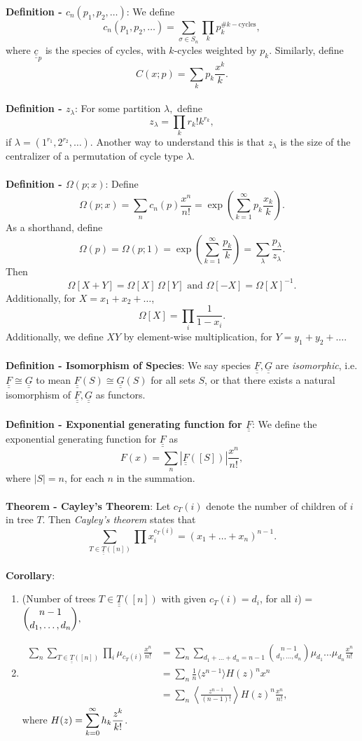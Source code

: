 \documentclass{article}
\newcommand{\species}[1]{\underline{\underline{#1}}}
\begin{document}
\textbf{Definition - $c_n(p_1, p_2, \dots)$}: We define $$c_n(p_1, p_2, \dots) = \sum_{\sigma \in S_n} \prod_k p_k^{\# k-\text{cycles}},$$ where $\species{c}_p$ is the species of cycles, with $k$-cycles weighted by $p_k$. Similarly, define $$C(x; p) = \sum_k p_k \frac{x^k}{k}.$$ \\
\textbf{Definition - $z_\lambda$}: For some partition $\lambda,$ define $$z_\lambda = \prod_k r_k! k^{r_k},$$ if $\lambda = (1^{r_1}, 2^{r_2}, \dots)$. Another way to understand this is that $z_\lambda$ is the size of the centralizer of a permutation of cycle type $\lambda$. \\ \\
\textbf{Definition - $\Omega(p; x)$}: Define $$\Omega(p; x) = \sum_n c_n(p) \frac{x^n}{n!} = \exp \left( \sum_{k = 1}^\infty p_k \frac{x_k}{k} \right).$$ As a shorthand, define $$\Omega(p) = \Omega(p; 1) = \exp \left( \sum_{k = 1}^\infty \frac{p_k}{k} \right) = \sum_\lambda \frac{p_\lambda}{z_\lambda}.$$ Then $$\Omega[X + Y] = \Omega[X] \, \Omega[Y] \text{ and } \Omega[-X] = \Omega[X]^{-1}.$$ Additionally, for $X = x_1 + x_2 + \dots$, $$\Omega[X] = \prod_i \frac{1}{1 - x_i}.$$ Additionally, we define $XY$ by element-wise multiplication, for $Y = y_1 + y_2 + \dots$. \\ \\
\textbf{Definition - Isomorphism of Species}: We say species $\species{F}, \species{G}$ are \textit{isomorphic}, i.e. $\species{F} \cong \species{G}$ to mean $\species{F}(S) \cong \species{G}(S)$ for all sets $S$, or that there exists a natural isomorphism of $\species{F}, \species{G}$ as functors. \\ \\
\textbf{Definition - Exponential generating function for $\species{F}$}: We define the exponential generating function for $\species{F}$ as $$F(x) = \sum_n |\species{F}([S])|\frac{x^n}{n!},$$ where $|S| = n$, for each $n$ in the summation. \\ \\
\textbf{Theorem - Cayley's Theorem}: Let $c_T(i)$ denote the number of children of $i$ in tree $T$. Then \textit{Cayley's theorem} states that $$\sum_{T \in \species{T}([n])} \prod x_i^{c_T(i)} = (x_1 + \dots + x_n)^{n - 1}.$$ \\
\textbf{Corollary}: \begin{enumerate}
    \item (Number of trees $T \in \species{T}([n])$ with given $c_T(i) = d_i$, for all $i$) = $\mathlarger{{n - 1 \choose d_1, \dots, d_n}},$
    \item \begin{align*}
        \sum_n \sum_{T \in \species{T}([n])} \prod_i \mu_{c_T(i)} \frac{x^n}{n!} &= \sum_n \sum_{d_1 + \dots + d_n = n - 1} {n - 1 \choose d_1, \dots, d_n} \mu_{d_1} \dots \mu_{d_n} \frac{x^n}{n!} \\
        &= \sum_n \frac{1}{n} \langle z^{n - 1} \rangle H(z)^n x^n \\
        &= \sum_n \left\langle \frac{z^{n - 1}}{(n - 1)!} \right\rangle H(z)^n \frac{x^n}{n!},
    \end{align*} where $H(z) = \mathlarger{\sum_{k = 0}^\infty h_k \frac{z^k}{k!}}$. 
\end{enumerate}
\end{document}
